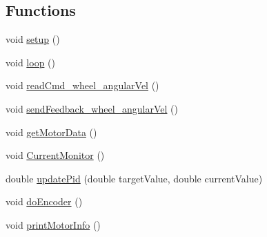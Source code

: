 \subsection*{Functions}
\begin{DoxyCompactItemize}
\item 
void \hyperlink{vnh5019__base_8ino_a4fc01d736fe50cf5b977f755b675f11d}{setup} ()
\item 
void \hyperlink{vnh5019__base_8ino_afe461d27b9c48d5921c00d521181f12f}{loop} ()
\item 
void \hyperlink{vnh5019__base_8ino_ac4276b52cff1f5cad9d20d488fb79e1c}{read\-Cmd\-\_\-wheel\-\_\-angular\-Vel} ()
\item 
void \hyperlink{vnh5019__base_8ino_aa0511fb24c92ad2e1d4d71885aa84fa0}{send\-Feedback\-\_\-wheel\-\_\-angular\-Vel} ()
\item 
void \hyperlink{vnh5019__base_8ino_a00c96795c30a7cbd9fe05718c75298ff}{get\-Motor\-Data} ()
\item 
void \hyperlink{vnh5019__base_8ino_afaca45e36c3e944e029b4e245de32e0a}{Current\-Monitor} ()
\item 
double \hyperlink{vnh5019__base_8ino_ac334ca8360da148f0c32266923ba61c3}{update\-Pid} (double target\-Value, double current\-Value)
\item 
void \hyperlink{vnh5019__base_8ino_a5a69102749662b52a841c506b07e4e73}{do\-Encoder} ()
\item 
void \hyperlink{vnh5019__base_8ino_a38ab3301c94e3ad9a094c7a276bfc46f}{print\-Motor\-Info} ()
\end{DoxyCompactItemize}
